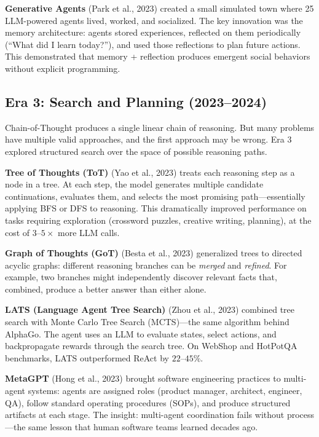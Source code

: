 \textbf{Generative Agents} (Park et al., 2023) created a small simulated town where 25 LLM-powered agents lived, worked, and socialized. The key innovation was the memory architecture: agents stored experiences, reflected on them periodically (``What did I learn today?''), and used those reflections to plan future actions. This demonstrated that memory + reflection produces emergent social behaviors without explicit programming.

\subsection{Era 3: Search and Planning (2023--2024)}

Chain-of-Thought produces a single linear chain of reasoning. But many problems have multiple valid approaches, and the first approach may be wrong. Era 3 explored structured search over the space of possible reasoning paths.

\textbf{Tree of Thoughts (ToT)} (Yao et al., 2023) treats each reasoning step as a node in a tree. At each step, the model generates multiple candidate continuations, evaluates them, and selects the most promising path---essentially applying BFS or DFS to reasoning. This dramatically improved performance on tasks requiring exploration (crossword puzzles, creative writing, planning), at the cost of $3$--$5\times$ more LLM calls.

\textbf{Graph of Thoughts (GoT)} (Besta et al., 2023) generalized trees to directed acyclic graphs: different reasoning branches can be \emph{merged} and \emph{refined}. For example, two branches might independently discover relevant facts that, combined, produce a better answer than either alone.

\textbf{LATS (Language Agent Tree Search)} (Zhou et al., 2023) combined tree search with Monte Carlo Tree Search (MCTS)---the same algorithm behind AlphaGo. The agent uses an LLM to evaluate states, select actions, and backpropagate rewards through the search tree. On WebShop and HotPotQA benchmarks, LATS outperformed ReAct by $22$--$45\%$.

\textbf{MetaGPT} (Hong et al., 2023) brought software engineering practices to multi-agent systems: agents are assigned roles (product manager, architect, engineer, QA), follow standard operating procedures (SOPs), and produce structured artifacts at each stage. The insight: multi-agent coordination fails without process---the same lesson that human software teams learned decades ago.

